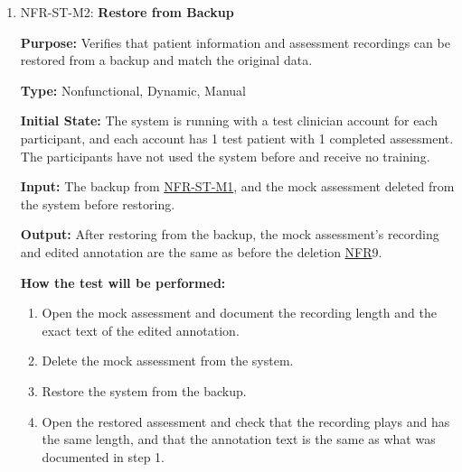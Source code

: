 \documentclass[12pt, titlepage]{article}
\newcommand{\srsnfr}[1]{\href{https://github.com/Nour-Fawaz/MacaBoca/blob/main/pdfs/SRS/SRS.pdf}{NFR}}
\renewcommand{\_}{\oldunderscore\allowbreak}
\begin{document}
\begin{enumerate}
  \item NFR-ST-M2: \textbf{Restore from Backup\\}
  \begin{mdframed}[linewidth=0.5mm]
      \textbf{Purpose:} Verifies that patient information and assessment recordings can be restored from a backup and match the original data. \par
      \textbf{Type:} Nonfunctional, Dynamic, Manual \par
      \textbf{Initial State:} The system is running with a test clinician account for each participant, and each account has 1 test patient with 1 completed assessment. The participants have not used the system before and receive no training. \par
      \textbf{Input:} The backup from \hyperlink{NFR-ST-M1}{NFR-ST-M1}, and the mock assessment deleted from the system before restoring. \par
      \textbf{Output:} After restoring from the backup, the mock assessment's recording and edited annotation are the same as before the deletion \srsnfr*{9}. \par
      \textbf{How the test will be performed:}
      \begin{enumerate}
      \item[1.] Open the mock assessment and document the recording length and the exact text of the edited annotation.
      \item[2.] Delete the mock assessment from the system.
      \item[3.] Restore the system from the backup.
      \item[4.] Open the restored assessment and check that the recording plays and has the same length, and that the annotation text is the same as what was documented in step 1.
      \end{enumerate}
  \end{mdframed}
\end{enumerate}
\end{document}
